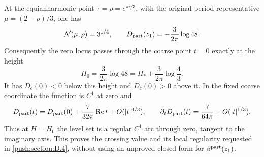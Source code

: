 \begin{proposition}\label{push:src:D.4.5}
At the equianharmonic point \(\tau=\rho=e^{\pi i/3}\), with the
original period representative \(\mu=(2-\rho)/3\), one has
\[
 \mathcal N(\mu,\rho)=3^{1/4},\qquad
 D_{\rm part}(z_1)=-\frac3{2\pi}\log48.
\]
Consequently the zero locus passes through the coarse point \(t=0\)
exactly at the height
\[
 H_0=\frac3{2\pi}\log48
 =H_*+\frac3{2\pi}\log\frac43.
\]
It has \(D_c(0)<0\) below this height and \(D_c(0)>0\) above it.
In the fixed coarse coordinate the function is \(C^1\) at zero and
\[
 D_{\rm part}(t)=D_{\rm part}(0)
       +\frac7{32\pi}\operatorname{Re}t+O(|t|^{4/3}),\qquad
 \partial_tD_{\rm part}(t)=\frac7{64\pi}+O(|t|^{1/3}).
\]
Thus at \(H=H_0\) the level set is a regular \(C^1\) arc through
zero, tangent to the imaginary axis. This proves the crossing value
and its local regularity requested in \ref{push:section:D.4}, without using an unproved
closed form for \(\beta^{\rm part}(z_1)\).
\end{proposition}

